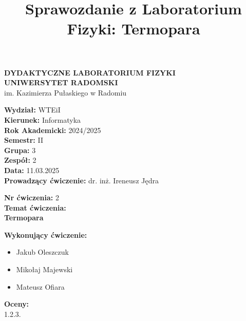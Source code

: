 \documentclass[11pt]{article}
\title{Sprawozdanie z Laboratorium Fizyki: Termopara}
\date{}
\begin{document}
\begin{titlepage}
    \centering
    \Large
    \textbf{DYDAKTYCZNE LABORATORIUM FIZYKI} \\
    \vspace{0.2cm}
    \textbf{UNIWERSYTET RADOMSKI}\\
    im. Kazimierza Pułaskiego w Radomiu \\
    
    \vspace{1.5cm}
    \begin{flushleft}
        \textbf{Wydział:} {WTEiI} \\
        \textbf{Kierunek:} Informatyka \\
        \textbf{Rok Akademicki:} 2024/2025 \\
        \textbf{Semestr:} II \\
        \textbf{Grupa:} 3 \\
        \textbf{Zespół:} 2 \\
        \textbf{Data:} 11.03.2025 \\
        \textbf{Prowadzący ćwiczenie:} dr. inż. Ireneusz Jędra \\
    \end{flushleft}
    
    \vspace{1cm}
    \begin{flushleft}
        \textbf{Nr ćwiczenia:} 2 \\
        \textbf{Temat ćwiczenia:} \\
        \textbf{Termopara} \\
    \end{flushleft}
    
    \vspace{1cm}
    \begin{flushleft}
        \textbf{Wykonujący ćwiczenie:}
        \begin{itemize}
            \item Jakub Oleszczuk
            \item Mikołaj Majewski
            \item Mateusz Ofiara
        \end{itemize}
    \end{flushleft}

    \vfill
    \begin{flushleft}
        \textbf{Oceny:} \\
        1.\hspace{2cm}2.\hspace{2cm}3.
    \end{flushleft}
\end{titlepage}
\end{document}
